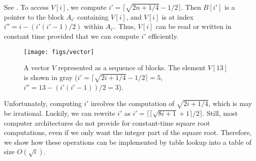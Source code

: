 See .
To access $V[i]$, we compute $i'=\lceil\sqrt{2n+1/4}-1/2\rceil$.  Then
$B[i']$ is a pointer to the block $A_{i'}$ containing $V[i]$, and $V[i]$ is
at index $i''=i-(i'(i'-1)/2)$ within $A_{i'}$.   Thus, $V[i]$ can be read or
written in constant time provided that we can compute $i'$ efficiently.

\begin{figure}
  \begin{center}
    \texttt{[image: figs/vector]}
  \end{center}
  \caption{A vector $V$ represented as a sequence of blocks.  The element
$V[13]$ is shown in gray ($i'=\lceil\sqrt{2i+1/4}-1/2\rceil = 5$,
$i''=13-(i'(i'-1))/2 = 3$).}
\end{figure}

Unfortunately, computing $i'$ involves the computation of $\sqrt{2i+1/4}$,
which is may be irrational.  Luckily, we can rewrite $i'$ as $i'=
\lceil\lceil\sqrt{8i+1}+1\rceil/2\rceil$.  Still, most computer
architectures do not provide for constant-time square root computations,
even if we only want the integer part of the square root.  Therefore, we
show how these operations can be implemented by table lookup into a table
of size $O(\sqrt{i})$.

